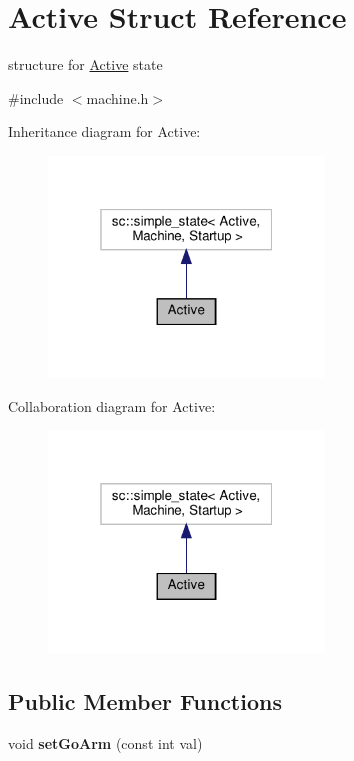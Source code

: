\hypertarget{structActive}{}\section{Active Struct Reference}
\label{structActive}


structure for \hyperlink{structActive}{Active} state  




{\ttfamily \#include $<$machine.\+h$>$}



Inheritance diagram for Active\+:
\nopagebreak
\begin{figure}[H]
\begin{center}
\leavevmode
\includegraphics[width=208pt]{structActive__inherit__graph}
\end{center}
\end{figure}


Collaboration diagram for Active\+:
\nopagebreak
\begin{figure}[H]
\begin{center}
\leavevmode
\includegraphics[width=208pt]{structActive__coll__graph}
\end{center}
\end{figure}
\subsection*{Public Member Functions}
\begin{DoxyCompactItemize}
\item 
\mbox{\label{structActive_a8a4356547bf4053173248ce72ee076d6}} 
void {\bfseries set\+Go\+Arm} (const int val)
\end{DoxyCompactItemize}

